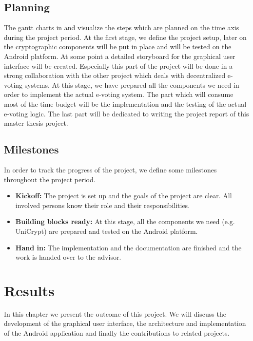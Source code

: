 \documentclass[numbers=noenddot, abstract=on, a4paper, headsepline,
footsepline, oneside, draft=off]{scrreprt}
\begin{document}
\section{Planning}
\label{sec:planning}
The gantt charts in  and 
visualize the steps which are planned on the time axis during the project period. At the first stage, we define the project setup,
later on the cryptographic components will be put in place and will be tested on
the Android platform. At some point a detailed storyboard for the graphical
user interface will be created. Especially this part of the project will be done
in a strong collaboration with the other project which deals with decentralized e-voting
systems. At this stage, we have prepared all the components we need in order to
implement the actual e-voting system. The part which will consume most of the
time budget will be the implementation and the testing of the actual e-voting
logic. The last part will be dedicated to writing the project report of this
master thesis project.



\section{Milestones}
\label{sec:milestones}
In order to track the progress of the project, we define some milestones
throughout the project period.
\begin{itemize}
  \item \textbf{Kickoff:} The project is set up and the goals of the project
  are clear. All involved persons know their role and their responsibilities.
  \item \textbf{Building blocks ready:} At this stage, all the components we
  need (e.g. UniCrypt) are prepared and tested on the Android platform.
  \item \textbf{Hand in:} The implementation and the documentation are finished
  and the work is handed over to the advisor.
\end{itemize}

\chapter{Results}
\label{cha:results}
In this chapter we present the outcome of this project. We will discuss the
development of the graphical user interface, the architecture and implementation
of the Android application and finally the contributions to related projects.
\end{document}
